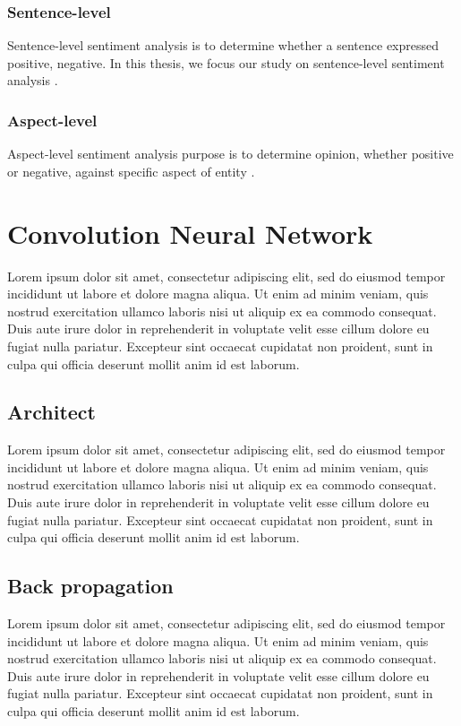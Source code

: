 \subsubsection{Sentence-level}
Sentence-level sentiment analysis is to determine whether a sentence expressed positive, negative. In this thesis, we focus our study on sentence-level sentiment analysis \cite{liu2012sentiment}. 
\subsubsection{Aspect-level}
Aspect-level  sentiment analysis purpose is to determine opinion, whether positive or negative, against specific aspect of entity \cite{liu2012sentiment}. 



\section{Convolution Neural Network}
Lorem ipsum dolor sit amet, consectetur adipiscing elit, sed do eiusmod tempor incididunt ut labore et dolore magna aliqua. Ut enim ad minim veniam, quis nostrud exercitation ullamco laboris nisi ut aliquip ex ea commodo consequat. Duis aute irure dolor in reprehenderit in voluptate velit esse cillum dolore eu fugiat nulla pariatur. Excepteur sint occaecat cupidatat non proident, sunt in culpa qui officia deserunt mollit anim id est laborum.
\subsection{Architect}
Lorem ipsum dolor sit amet, consectetur adipiscing elit, sed do eiusmod tempor incididunt ut labore et dolore magna aliqua. Ut enim ad minim veniam, quis nostrud exercitation ullamco laboris nisi ut aliquip ex ea commodo consequat. Duis aute irure dolor in reprehenderit in voluptate velit esse cillum dolore eu fugiat nulla pariatur. Excepteur sint occaecat cupidatat non proident, sunt in culpa qui officia deserunt mollit anim id est laborum.
\subsection{Back propagation}
Lorem ipsum dolor sit amet, consectetur adipiscing elit, sed do eiusmod tempor incididunt ut labore et dolore magna aliqua. Ut enim ad minim veniam, quis nostrud exercitation ullamco laboris nisi ut aliquip ex ea commodo consequat. Duis aute irure dolor in reprehenderit in voluptate velit esse cillum dolore eu fugiat nulla pariatur. Excepteur sint occaecat cupidatat non proident, sunt in culpa qui officia deserunt mollit anim id est laborum.
